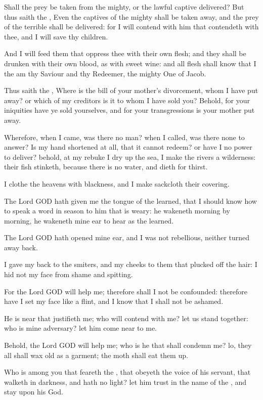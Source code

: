 \Verse Shall the prey be taken from the mighty, or the lawful captive delivered?  \Verse But thus saith the \LORD, Even the captives of the mighty shall be taken away, and the prey of the terrible shall be delivered: for I will contend with him that contendeth with thee, and I will save thy children.

\Verse And I will feed them that oppress thee with their own flesh; and they shall be drunken with their own blood, as with sweet wine: and all flesh shall know that I the \LORD am thy Saviour and thy Redeemer, the mighty One of Jacob.


\Chapter
\Verse Thus saith the \LORD, Where is the bill of your mother's divorcement, whom I have put away? or which of my creditors is it to whom I have sold you?  Behold, for your iniquities have ye sold yourselves, and for your transgressions is your mother put away.

\Verse Wherefore, when I came, was there no man? when I called, was there none to answer? Is my hand shortened at all, that it cannot redeem? or have I no power to deliver? behold, at my rebuke I dry up the sea, I make the rivers a wilderness: their fish stinketh, because there is no water, and dieth for thirst.

\Verse I clothe the heavens with blackness, and I make sackcloth their covering.

\Verse The Lord GOD hath given me the tongue of the learned, that I should know how to speak a word in season to him that is weary: he wakeneth morning by morning, he wakeneth mine ear to hear as the learned.

\Verse The Lord GOD hath opened mine ear, and I was not rebellious, neither turned away back.

\Verse I gave my back to the smiters, and my cheeks to them that plucked off the hair: I hid not my face from shame and spitting.

\Verse For the Lord GOD will help me; therefore shall I not be confounded: therefore have I set my face like a flint, and I know that I shall not be ashamed.

\Verse He is near that justifieth me; who will contend with me? let us stand together: who is mine adversary? let him come near to me.

\Verse Behold, the Lord GOD will help me; who is he that shall condemn me?  lo, they all shall wax old as a garment; the moth shall eat them up.

\Verse Who is among you that feareth the \LORD, that obeyeth the voice of his servant, that walketh in darkness, and hath no light? let him trust in the name of the \LORD, and stay upon his God.

